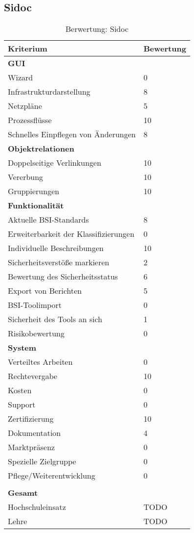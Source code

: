 \subsection{Sidoc}
\begin{table}[h]
\begin{tabular}{|p{}|p{}|}
\hline 
Kriterium & Bewertung\\ 
\hline 
\textbf{GUI}& \\
\hline
Wizard & 0\\
\hline 
Infrastrukturdarstellung & 8 \\
\hline 
Netzpläne & 5 \\
\hline 
Prozessflüsse & 10 \\
\hline 
Schnelles Einpflegen von Änderungen & 8 \\
\hline
\textbf{Objektrelationen} & \\
\hline 
Doppelseitige Verlinkungen & 10 \\
\hline 
Vererbung & 10 \\
\hline 
Gruppierungen & 10 \\
\hline 
\textbf{Funktionalität} &\\
\hline 
Aktuelle BSI-Standards & 8 \\
\hline  
Erweiterbarkeit der Klassifizierungen & 0 \\
\hline 
Individuelle Beschreibungen & 10 \\
\hline 
Sicherheitsverstöße markieren & 2 \\
\hline
Bewertung des Sicherheitsstatus & 6 \\
\hline
Export von Berichten & 5 \\
\hline
BSI-Toolimport & 0 \\
\hline
Sicherheit des Tools an sich & 1 \\
\hline
Risikobewertung & 0 \\
\hline
\textbf{System}&  \\
\hline
Verteiltes Arbeiten & 0 \\
\hline
Rechtevergabe & 10 \\
\hline
Kosten & 0 \\
\hline
Support & 0 \\
\hline
Zertifizierung & 10 \\
\hline
Dokumentation & 4 \\
\hline
Marktpräsenz & 0 \\
\hline
Spezielle Zielgruppe & 0 \\
\hline
Pflege/Weiterentwicklung & 0 \\
\hline
\multicolumn{2}{c}{}\\
\hline
\textbf{Gesamt} & \\
\hline
Hochschuleinsatz & TODO\\
\hline
Lehre & TODO\\
\hline
\end{tabular} 
\caption{Berwertung: Sidoc}
\label{tab:BerwertungSidoc}
\end{table}